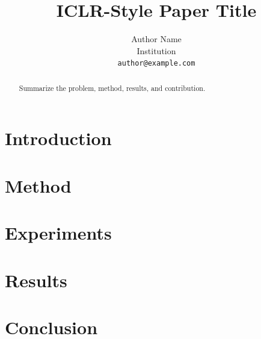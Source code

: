 \documentclass{article}
\title{ICLR-Style Paper Title}
\author{Author Name\\Institution\\\texttt{author@example.com}}
\begin{document}
\maketitle

\begin{abstract}
Summarize the problem, method, results, and contribution.
\end{abstract}

\section{Introduction}
\section{Method}
\section{Experiments}
\section{Results}
\section{Conclusion}

% 
% 
\end{document}
